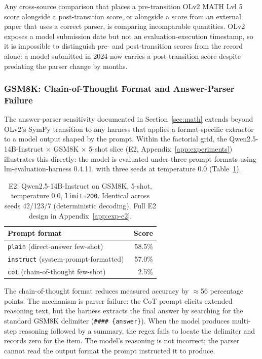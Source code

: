 \documentclass[11pt]{article}
\begin{document}
Any cross-source comparison that places a pre-transition OLv2 MATH Lvl 5
score alongside a post-transition score, or alongside a score from an
external paper that uses a correct parser, is comparing incomparable
quantities. OLv2 exposes a model submission date but not an
evaluation-execution timestamp, so it is impossible to distinguish pre- and
post-transition scores from the record alone: a model submitted in 2024
now carries a post-transition score despite predating the parser change by
months.

\subsubsection{GSM8K: Chain-of-Thought Format and Answer-Parser Failure}
\label{sec:gsm8k}

The answer-parser sensitivity documented in Section~\ref{sec:math} extends
beyond OLv2's SymPy transition to any harness that applies a format-specific
extractor to a model output shaped by the prompt. Within the factorial
grid, the Qwen2.5-14B-Instruct $\times$ GSM8K $\times$ 5-shot slice (E2,
Appendix~\ref{app:experiments}) illustrates this directly: the model is
evaluated under three prompt formats using lm-evaluation-harness 0.4.11,
with three seeds at temperature 0.0 (Table~\ref{tab:e2-body}).


\begin{table}[ht]
\centering
\small
\begin{tabular}{lr}
\toprule
Prompt format & Score \\
\midrule
\texttt{plain} (direct-answer few-shot)      & 58.5\% \\
\texttt{instruct} (system-prompt-formatted)  & 57.0\% \\
\texttt{cot} (chain-of-thought few-shot)     & ~~2.5\% \\
\bottomrule
\end{tabular}
\caption{E2: Qwen2.5-14B-Instruct on GSM8K, 5-shot, temperature 0.0,
\texttt{limit=200}. Identical across seeds 42/123/7 (deterministic
decoding). Full E2 design in Appendix~\ref{app:exp-e2}.}
\label{tab:e2-body}
\end{table}

The chain-of-thought format reduces measured accuracy by $\approx$56 percentage
points. The mechanism is parser failure: the CoT prompt elicits extended
reasoning text, but the harness extracts the final answer by searching for the
standard GSM8K delimiter (\texttt{\#\#\#\#~\{answer\}}). When the model
produces multi-step reasoning followed by a summary, the regex fails to locate
the delimiter and records zero for the item. The model's reasoning is not
incorrect; the parser cannot read the output format the prompt instructed it
to produce.
\end{document}
